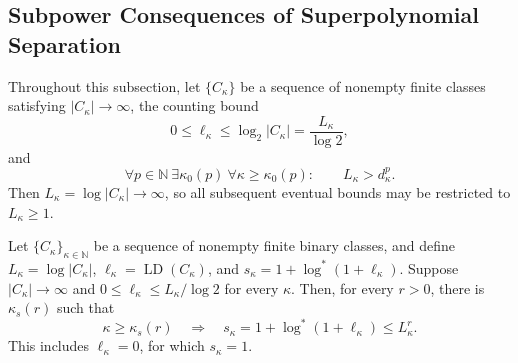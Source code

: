 \subsection{Subpower Consequences of Superpolynomial Separation}
\label{app:subpower}

Throughout this subsection, let \(\{C_\kappa\}\) be a sequence of
nonempty finite classes satisfying \(|C_\kappa|\to\infty\), the
counting bound
\[
0\leq\ell_\kappa\leq\log_2|C_\kappa|
=\frac{L_\kappa}{\log2},
\]
and
\begin{equation}
\forall p\in\mathbb N\ \exists\kappa_0(p)\
\forall\kappa\geq\kappa_0(p):
\qquad L_\kappa>d_\kappa^p.
\label{eq:app-a57}
\end{equation}
Then \(L_\kappa=\log|C_\kappa|\to\infty\), so all subsequent
eventual bounds may be restricted to \(L_\kappa\geq1\).

\begin{lemma}
\label{lem:step-004-iterated-log-subpower}
Let \(\{C_\kappa\}_{\kappa\in\mathbb N}\) be a sequence of nonempty
finite binary classes, and define
\(L_\kappa=\log|C_\kappa|\),
\(\ell_\kappa=\operatorname{LD}(C_\kappa)\), and
\(s_\kappa=1+\log^*(1+\ell_\kappa)\).  Suppose
\(|C_\kappa|\to\infty\) and
\(0\leq\ell_\kappa\leq L_\kappa/\log2\) for every \(\kappa\).
Then, for every \(r>0\), there is
\(\kappa_s(r)\) such that
\begin{equation}
\kappa\geq\kappa_s(r)
\quad\Longrightarrow\quad
s_\kappa=1+\log^*(1+\ell_\kappa)
\leq L_\kappa^r.
\label{eq:app-a58}
\end{equation}
This includes \(\ell_\kappa=0\), for which \(s_\kappa=1\).
\end{lemma}

